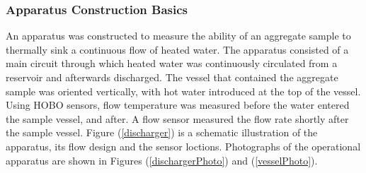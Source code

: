 \documentclass[12pt]{article}
\numberwithin{equation}{section}
\numberwithin{table}{section}
\numberwithin{figure}{section}
\begin{document}
\subsubsection{Apparatus Construction Basics}
An apparatus was constructed to measure the ability of an aggregate sample to thermally sink a continuous flow of heated water. The apparatus consisted of a main circuit through which heated water was continuously circulated from a reservoir and afterwards discharged. The vessel that contained the aggregate sample was oriented vertically, with hot water introduced at the top of the vessel. Using HOBO sensors, flow temperature was measured before the water entered the sample vessel, and after. A flow sensor measured the flow rate shortly after the sample vessel. Figure (\ref{discharger}) is a schematic illustration of the apparatus, its flow design and the sensor loctions. Photographs of the operational apparatus are shown in Figures (\ref{dischargerPhoto}) and (\ref{vesselPhoto}). 
\end{document}
